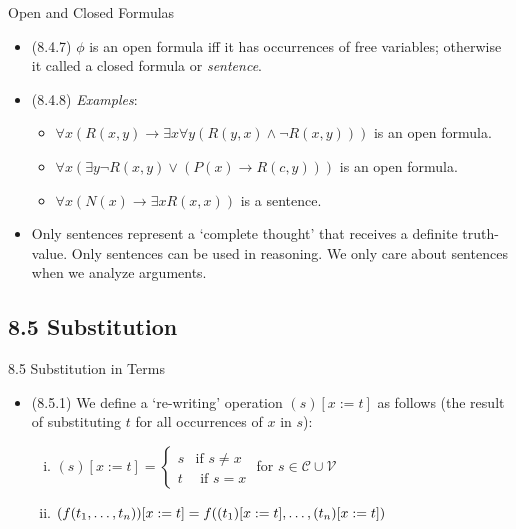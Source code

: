 \begin{frame}{Open and Closed Formulas}

	\begin{itemize}%
	\itemsep=16pt
	
		\item (8.4.7) $\phi$ is an open formula iff it has occurrences of free variables; otherwise it called a closed formula or \emph{sentence}.
		
		\item (8.4.8) \emph{Examples}:
		
		\begin{itemize}
			
				\item $\forall x(R(x,y)\to \exists x\forall y(R(y,x)\land \neg R(x,y)))$ is an open formula.

			
				\item $\forall x(\exists y \neg R(x,y)\lor (P(x)\to R(c,y)))$ is an open formula.

				\item $\forall x({N}(x)\to {\exists x}R(x,x))$ is a sentence.
			
			\end{itemize}
			
		
		\item Only sentences represent a `complete thought' that receives a definite truth-value. Only sentences can be used in reasoning. We only care about sentences when we analyze arguments.
		
		
	\end{itemize}

\end{frame}

\subsection{8.5 Substitution}
\begin{frame}{8.5 Substitution in Terms}

	\begin{itemize}%
	\itemsep=16pt
	
	
		\item (8.5.1) We define a `re-writing' operation $(s)[x:=t]$ as follows (the result of substituting $t$ for all occurrences of $x$ in $s$):
		
		\medskip	
		
		\begin{enumerate}[(i)]
		\itemsep=10pt
			
				\item $(s)[x:=t]=\begin{cases} s & \text{if } s\neq x\\ t & \text{ if }s=x\end{cases}$ for $s\in \mathcal{C}\cup\mathcal{V}$
				
				\item $(f(t_1,\mathellipsis, t_n))[x:=t]=f((t_1)[x:=t], \mathellipsis, (t_n)[x:=t])$
			
			\end{enumerate} 
			
			
	\end{itemize}

\end{frame}

